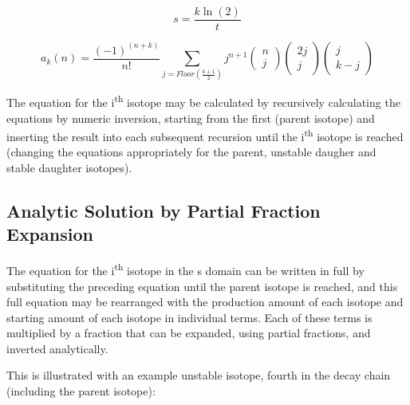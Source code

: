 \documentclass[12pt,twoside]{manual}
\begin{document}
\begin{equation}
s = \frac{k \ln(2)}{t}
\end{equation}

\begin{equation}
a_{k}(n) = \frac{(-1)^{(n+k)}}{n!} \sum_{j=Floor(\frac{k+1}{2})} j^{n+1} \left( \begin{matrix} n \\ j \end{matrix} \right)  \left( \begin{matrix} 2j \\ j \end{matrix} \right)  \left( \begin{matrix} j \\ k-j \end{matrix} \right)
\end{equation}

The equation for the i\textsuperscript{th} isotope may be calculated by recursively calculating the equations by numeric inversion, starting from the first (parent isotope) and inserting the result into each subsequent recursion until the i\textsuperscript{th} isotope is reached (changing the equations appropriately for the parent, unstable daugher and stable daughter isotopes).


\subsection{Analytic Solution by Partial Fraction Expansion}

The equation for the i\textsuperscript{th} isotope in the s domain can be written in full by substituting the preceding equation until the parent isotope is reached, and this full equation may be rearranged with the production amount of each isotope and starting amount of each isotope in individual terms.  Each of these terms is multiplied by a fraction that can be expanded, using partial fractions, and inverted analytically.

This is illustrated with an example unstable isotope, fourth in the decay chain (including the parent isotope):
\end{document}
